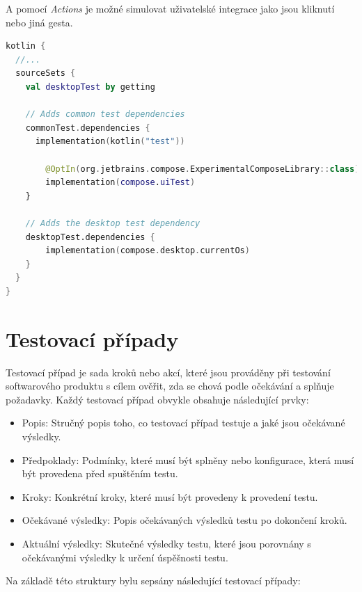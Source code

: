 A pomocí \textit{Actions} je možné simulovat uživatelské integrace jako jsou kliknutí nebo jiná gesta. \cite{composeTesting}


\begin{lstlisting}[caption={Integrace testů Gradle}, label={lst:testsIntegration}, language=Kotlin]
kotlin {
  //...
  sourceSets {
    val desktopTest by getting

    // Adds common test dependencies
    commonTest.dependencies {
      implementation(kotlin("test"))

        @OptIn(org.jetbrains.compose.ExperimentalComposeLibrary::class)
        implementation(compose.uiTest)
    }

    // Adds the desktop test dependency
    desktopTest.dependencies {
        implementation(compose.desktop.currentOs)
    }
  }
}
\end{lstlisting}
\section{Testovací případy}
Testovací případ je sada kroků nebo akcí, které jsou prováděny při testování softwarového produktu s cílem ověřit, zda se chová podle očekávání a splňuje 
požadavky. Každý testovací případ obvykle obsahuje následující prvky:

\begin{itemize}
  \item Popis: Stručný popis toho, co testovací případ testuje a jaké jsou očekávané výsledky.
  \item Předpoklady: Podmínky, které musí být splněny nebo konfigurace, která musí být provedena před spuštěním testu.
  \item Kroky: Konkrétní kroky, které musí být provedeny k provedení testu.
  \item Očekávané výsledky: Popis očekávaných výsledků testu po dokončení kroků.
  \item Aktuální výsledky: Skutečné výsledky testu, které jsou porovnány s očekávanými výsledky k určení úspěšnosti testu.
\end{itemize}

Na základě této struktury bylu sepsány následující testovací případy:



